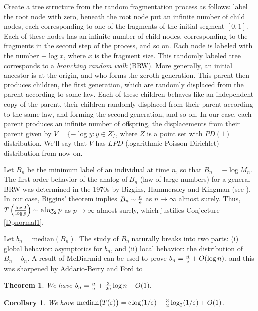 \documentclass[12pt]{amsart}
\theoremstyle{remark}
\theoremstyle{plain}
\newtheorem{thm}{Theorem}
\newtheorem{cor}{Corollary}
\numberwithin{equation}{section}
\newcommand{\eps}{\ensuremath{\varepsilon}}
\renewcommand{\(}{\left(}
\renewcommand{\)}{\right)}
\newcommand{\pfrac}[2]{\left(\frac{#1}{#2}\right)}
\newcommand{\er}{{\rm e}}  %
\begin{document}
Create a tree structure from the random fragmentation
process as follows: label the root
node with zero, beneath the root node put an infinite number of
child nodes, each corresponding to one of the fragments of the
initial segment $[0,1]$.  Each of these nodes has an infinite number
of child nodes, corresponding to the fragments in the second step of
the process, and so on.  Each node is labeled with the number $-\log
x$, where $x$ is the fragment size.  This randomly labeled tree
corresponds to a \emph{branching random walk} (BRW).
More generally, an initial ancestor
is at the origin, and who forms the zeroth generation.  This parent
then produces children, the first generation, which are randomly
displaced from the parent according to some law.  Each of these
children behaves like an independent copy of the parent, their
children randomly displaced from their parent according to the same
law, and forming the second generation, and so on.  In our case,
each parent produces an infinite number of offspring, the
displacements from their parent given by $V=\{-\log y : y\in Z\}$,
where $Z$ is a point set with $PD(1)$ distribution.  We'll say that
$V$ has $LPD$ (logarithmic Poisson-Dirichlet) distribution from now
on.

Let $B_n$ be the minimum label of an individual at time
$n$, so that $B_n = -\log M_n$.  The first order behavior of 
the analog of $B_n$ (law of large numbers) for a general BRW
was determined in the 1970s by Biggins, Hammersley and Kingman
(see \cite{Big}).
In our case, Biggins' theorem \cite{Big} implies
$B_n \sim \frac{n}{\er}$ as $n\to\infty$  almost surely.
Thus,
$T\pfrac{\log 2}{\log p} \sim \er \log_2 p$ as $p\to\infty$ almost surely,
which justifies Conjecture \ref{Dpnormal1}.

Let $b_n = \text{median}(B_n)$.  The study of $B_n$ naturally breaks
into two parts: (i) global behavior: asymptotics for $b_n$,
and (ii) local behavior: the distribution of $B_n-b_n$.  A result of
McDiarmid \cite{Mc} can be used to prove $b_n=\frac{n}{\er}+O(\log n)$, and this
was sharpened by Addario-Berry and Ford \cite{ABF} to

\begin{thm}\label{bnsharp}  We have
$b_n = \frac{n}{\er} + \frac{3}{2\er}\log n + O(1).$
\end{thm}

\begin{cor} We have
$\text{median} \bigl(
T(\eps)\bigr) = \er \log (1/\eps) - \frac32 \log_2 (1/\eps)+O(1)$.
\end{cor}
\end{document}
